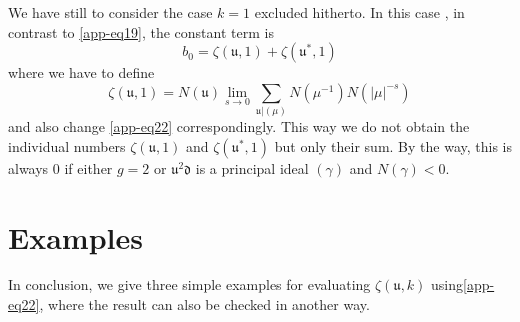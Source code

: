 We have still to consider the case $k=1$ excluded hitherto. In this
case \cite{app-key3}, in contrast to \eqref{app-eq19}, the constant term is
$$
b_{0}=\zeta(\mathfrak{u},1)+\zeta(\mathfrak{u}^{\ast},1)
$$
where we have to define
$$
\zeta(\mathfrak{u},1)=N(\mathfrak{u})\lim\limits_{s\to
  0}\sum_{\mathfrak{u}|(\mu)}N(\mu^{-1})N(|\mu|^{-s})
$$
and also change \eqref{app-eq22} correspondingly. This way we do not
obtain the individual numbers $\zeta(\mathfrak{u},1)$ and
$\zeta(\mathfrak{u}^{\ast},1)$ but only their sum. By the way, this is
always $0$ if either $g=2$ or $\mathfrak{u}^{2}\mathfrak{d}$ is a
principal ideal $(\gamma)$ and $N(\gamma)<0$.

\section{Examples}\label{app-sec3}

In conclusion, we give three simple examples for evaluating
$\zeta(\mathfrak{u},k)$ using\pageoriginale \eqref{app-eq22}, where
the result can also be checked in another way.

